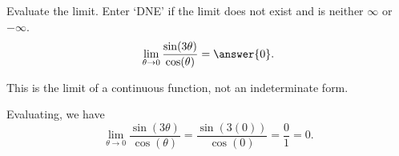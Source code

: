 \documentclass{ximera}
\author{Emma Smith Zbarsky \and Bobby Ramsey}
\begin{document}
\begin{exercise}

Evaluate the limit. Enter `DNE' if the limit does not exist and is neither $\infty$ or $-\infty$. 
\[\lim_{\theta \to 0} \frac{\sin(3\theta)}{\cos(\theta)} = \answer{0}.\]


\begin{hint}
This is the limit of a continuous function, not an indeterminate form.
\end{hint}


\begin{hint}
Evaluating, we have
\[\lim_{\theta \to 0} \frac{\sin(3\theta)}{\cos(\theta)} = \frac{\sin(3(0))}{\cos(0)} = \frac{0}{1} = 0.\]
\end{hint}



\end{exercise}
\end{document}
